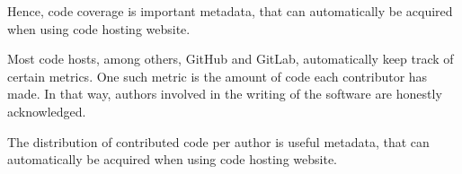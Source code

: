 Hence, code coverage is important metadata, that can automatically
be acquired when using code hosting website.

Most code hosts, among others, GitHub and GitLab,
automatically keep track of certain metrics.
One such metric is the amount of code each contributor has made.
In that way, authors involved in the writing of the software
are honestly acknowledged. 

The distribution of contributed code per author 
is useful metadata, that can automatically
be acquired when using code hosting website.


